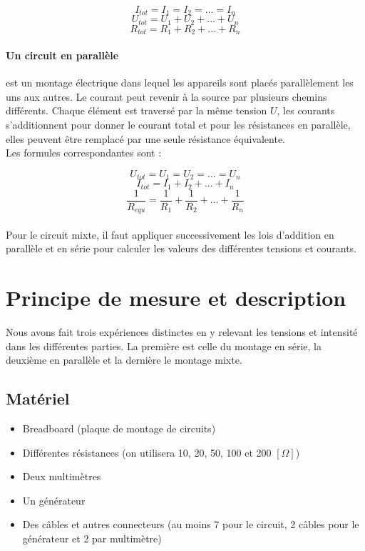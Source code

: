 \documentclass[11pt]{article}
\begin{document}
$$I_{tot}=I_1=I_2=...=I_n$$
$$U_{tot}= U_1+U_2+...+U_n$$
$$R_{tot}= R_1+R_2+...+R_n$$

\paragraph{Un circuit en parallèle} est un montage électrique dans lequel les appareils sont placés parallèlement les uns aux autres. Le courant peut revenir à la source par plusieurs chemins différents. Chaque élément est traversé par la même tension $U$, les courants s’additionnent pour donner le courant total et pour les résistances en parallèle, elles peuvent être remplacé par une seule résistance équivalente.\\
Les formules correspondantes sont : 

$$U_{tot}=U_1=U_2=...=U_n$$
$$I_{tot}= I_1+I_2+...+I_n$$
$$\frac{1}{R_{equ}}=\frac{1}{R_1}+\frac{1}{R_2}+...+\frac{1}{R_n}$$\\

Pour le circuit mixte, il faut appliquer successivement les lois d’addition en parallèle et en série pour calculer les valeurs des différentes tensions et courants.  

\section{Principe de mesure et description}

Nous avons fait trois expériences distinctes en y relevant les tensions et intensité dans les différentes parties. La première est celle du montage en série, la deuxième en parallèle et la dernière le montage mixte.

\subsection{Matériel}

\begin{itemize}
\item Breadboard (plaque de montage de circuits)
\item Différentes résistances (on utilisera 10, 20, 50, 100 et 200 $[\Omega]$)
\item Deux multimètres
\item Un générateur
\item Des câbles et autres connecteurs (au moins 7 pour le circuit, 2 câbles pour le générateur et 2 par multimètre)
\end{itemize}
\end{document}
